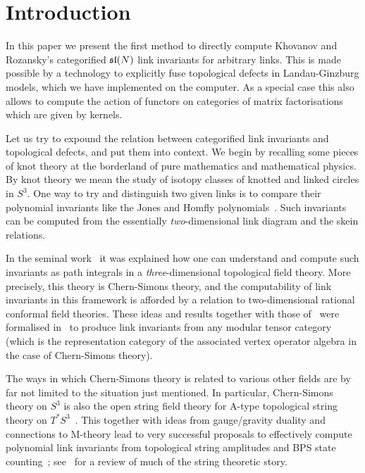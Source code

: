 \documentclass{compositio}
\theoremstyle{definition}
\numberwithin{equation}{section}
\begin{document}
\maketitle

\section{Introduction}

In this paper we present the first method to directly compute Khovanov and Rozansky's categorified $\mathfrak{sl}(N)$ link invariants for arbitrary links. This is made possible by a technology to explicitly fuse topological defects in Landau-Ginzburg models, which we have implemented on the computer. As a special case this also allows to compute the action of functors on categories of matrix factorisations which are given by kernels. 

Let us try to expound the relation between categorified link invariants and topological defects, and put them into context. We begin by recalling some pieces of knot theory at the borderland of pure mathematics and mathematical physics. By knot theory we mean the study of isotopy classes of knotted and linked circles in $S^3$. One way to try and distinguish two given links is to compare their polynomial invariants like the Jones and Homfly polynomials~\cite{JonesPolynomialPaper, Homfly, HomflyPT}. Such invariants can be computed from the essentially \emph{two}-dimensional link diagram and the skein relations. 

In the seminal work~\cite{wittenjones} it was explained how one can understand and compute such invariants as path integrals in a \emph{three}-dimensional topological field theory. More precisely, this theory is Chern-Simons theory, and the computability of link invariants in this framework is afforded by a relation to two-dimensional rational conformal field theories. These ideas and results together with those of~\cite{t1988YB} were formalised in~\cite{RT1990, RT1991, turaevbook} to produce link invariants from any modular tensor category (which is the representation category of the associated vertex operator algebra in the case of Chern-Simons theory). 

The ways in which Chern-Simons theory is related to various other fields are by far not limited to the situation just mentioned. In particular, Chern-Simons theory on $S^3$ is also the open string field theory for A-type topological string theory on $T^*S^3$~\cite{w9207094}. This together with ideas from gauge/gravity duality and connections to M-theory lead to very successful proposals to effectively compute polynomial link invariants from topological string amplitudes and BPS state counting~\cite{gv9811131, ov9912123, lmv0010102}; see~\cite{marinoknotbook} for a review of much of the string theoretic story. 
\end{document}
